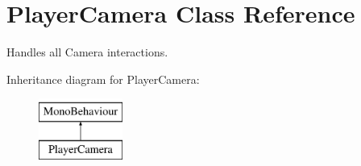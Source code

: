 \hypertarget{class_player_camera}{}\section{Player\+Camera Class Reference}
\label{class_player_camera}


Handles all Camera interactions.  


Inheritance diagram for Player\+Camera\+:\begin{figure}[H]
\begin{center}
\leavevmode
\includegraphics[height=2.000000cm]{class_player_camera}
\end{center}
\end{figure}
